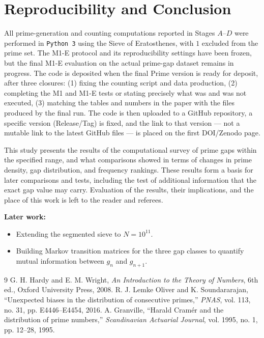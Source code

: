 \documentclass[12pt,a4paper]{article}
\begin{document}
\section{Reproducibility and Conclusion}
All prime-generation and counting computations reported in Stages $A$--$D$ were performed in \texttt{Python 3} using the Sieve of Eratosthenes, with $1$ excluded from the prime set. The M1-E protocol and its reproducibility settings have been frozen, but the final M1-E evaluation on the actual prime-gap dataset remains in progress. The code is deposited when the final Prime version is ready for deposit, after three closures: (1) fixing the counting script and data production, (2) completing the M1 and M1-E tests or stating precisely what was and was not executed, (3) matching the tables and numbers in the paper with the files produced by the final run. The code is then uploaded to a GitHub repository, a specific version (Release/Tag) is fixed, and the link to that version — not a mutable link to the latest GitHub files — is placed on the first DOI/Zenodo page.

This study presents the results of the computational survey of prime gaps within the specified range, and what comparisons showed in terms of changes in prime density, gap distribution, and frequency rankings. These results form a basis for later comparisons and tests, including the test of additional information that the exact gap value may carry. Evaluation of the results, their implications, and the place of this work is left to the reader and referees.

\textbf{Later work:}
\begin{itemize}
\item Extending the segmented sieve to $N = 10^{11}$.
\item Building Markov transition matrices for the three gap classes to quantify mutual information between $g_n$ and $g_{n+1}$.
\end{itemize}
\begin{thebibliography}{9}
 G. H. Hardy and E. M. Wright, \textit{An Introduction to the Theory of Numbers}, 6th ed., Oxford University Press, 2008.
 R. J. Lemke Oliver and K. Soundararajan, ``Unexpected biases in the distribution of consecutive primes,'' \textit{PNAS}, vol. 113, no. 31, pp. E4446--E4454, 2016.
 A. Granville, ``Harald Cram\'er and the distribution of prime numbers,'' \textit{Scandinavian Actuarial Journal}, vol. 1995, no. 1, pp. 12--28, 1995.
\end{thebibliography}
\end{document}
